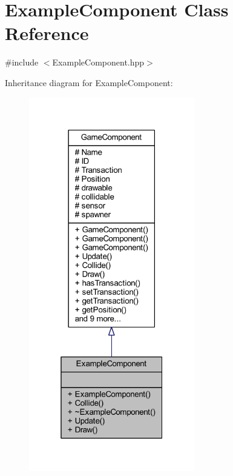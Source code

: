 \hypertarget{class_example_component}{\section{Example\-Component Class Reference}
\label{class_example_component}
}


{\ttfamily \#include $<$Example\-Component.\-hpp$>$}



Inheritance diagram for Example\-Component\-:\nopagebreak
\begin{figure}[H]
\begin{center}
\leavevmode
\includegraphics[width=205pt]{class_example_component__inherit__graph}
\end{center}
\end{figure}


